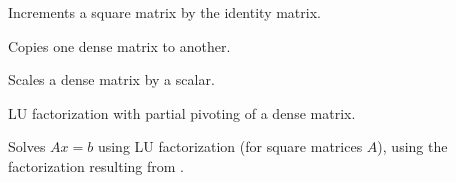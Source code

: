 \documentclass[letterpaper,10pt,english]{sphinxmanual}
\begin{document}

\begin{fulllineitems}
\label{linear_solvers/DLS:AddIdentity}
Increments a square matrix by the identity matrix.

\end{fulllineitems}


\begin{fulllineitems}
\label{linear_solvers/DLS:DenseCopy}
Copies one dense matrix to another.

\end{fulllineitems}


\begin{fulllineitems}
\label{linear_solvers/DLS:DenseScale}
Scales a dense matrix by a scalar.

\end{fulllineitems}


\begin{fulllineitems}
\label{linear_solvers/DLS:DenseGETRF}
LU factorization with partial pivoting of a dense matrix.

\end{fulllineitems}


\begin{fulllineitems}
\label{linear_solvers/DLS:denseGETRF}
Solves $Ax = b$ using LU factorization (for square matrices
$A$), using the factorization resulting from {\hyperref[linear_solvers/DLS:DenseGETRF]{}}.

\end{fulllineitems}
\end{document}
